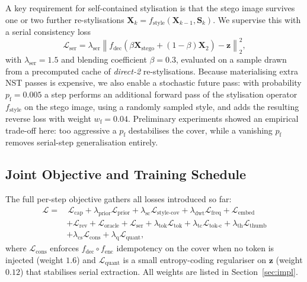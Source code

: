 \documentclass[runningheads]{llncs}
\begin{document}
A key requirement for self-contained stylisation is that the stego image survives one or two further re-stylisations $\mathbf{X}_{k}\!=\!f_{\text{style}}(\mathbf{X}_{k-1},\mathbf{S}_{k})$. We supervise this with a serial consistency loss
\begin{equation}
    \mathcal{L}_{\text{ser}} = \lambda_{\text{ser}}\!\left\|f_{\text{dec}}\!\left(\beta\mathbf{X}_{\text{stego}}+(1-\beta)\mathbf{X}_{2}\right)-\mathbf{z}\right\|_2^{2},
    \label{eq:ser}
\end{equation}
with $\lambda_{\text{ser}}\!=\!1.5$ and blending coefficient $\beta\!=\!0.3$, evaluated on a sample drawn from a precomputed cache of \emph{direct-2} re-stylisations. Because materialising extra NST passes is expensive, we also enable a stochastic future pass: with probability $p_{\text{f}}\!=\!0.005$ a step performs an additional forward pass of the stylisation operator $f_{\text{style}}$ on the stego image, using a randomly sampled style, and adds the resulting reverse loss with weight $w_{\text{f}}\!=\!0.04$. Preliminary experiments showed an empirical trade-off here: too aggressive a $p_{\text{f}}$ destabilises the cover, while a vanishing $p_{\text{f}}$ removes serial-step generalisation entirely.

\subsection{Joint Objective and Training Schedule}
\label{sec:total}
The full per-step objective gathers all losses introduced so far:
\begin{equation}
\begin{aligned}
\mathcal{L} =&\, \mathcal{L}_{\text{cap}} + \lambda_{\text{prior}}\mathcal{L}_{\text{prior}} + \lambda_{\text{sc}}\mathcal{L}_{\text{style-cov}}
 + \lambda_{\text{dwt}}\mathcal{L}_{\text{freq}} + \mathcal{L}_{\text{embed}} \\
& + \mathcal{L}_{\text{rev}} + \mathcal{L}_{\text{oracle}} + \mathcal{L}_{\text{ser}}
 + \lambda_{\text{tok}}\mathcal{L}_{\text{tok}} + \lambda_{\text{tc}}\mathcal{L}_{\text{tok-c}} + \lambda_{\text{th}}\mathcal{L}_{\text{thumb}} \\
& + \lambda_{\text{cs}}\mathcal{L}_{\text{cons}} + \lambda_{\text{q}}\mathcal{L}_{\text{quant}},
\end{aligned}
\label{eq:total}
\end{equation}
where $\mathcal{L}_{\text{cons}}$ enforces $f_{\text{dec}}\!\circ\!f_{\text{enc}}$ idempotency on the cover when no token is injected (weight $1.6$) and $\mathcal{L}_{\text{quant}}$ is a small entropy-coding regulariser on $\mathbf{z}$ (weight $0.12$) that stabilises serial extraction. All weights are listed in Section~\ref{sec:impl}.
\end{document}
